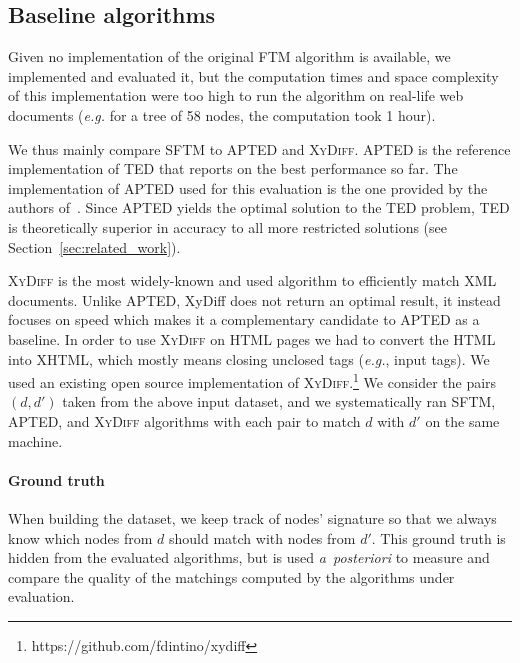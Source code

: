 \subsection{Baseline algorithms}
Given no implementation of the original FTM algorithm is available, we implemented and evaluated it, but the computation times and space complexity of this implementation were too high to run the algorithm on real-life web documents (\emph{e.g.} for a tree of 58 nodes, the computation took 1 hour).

We thus mainly compare SFTM to APTED and \textsc{XyDiff}.
APTED is the reference implementation of TED that reports on the best performance so far.
The implementation of APTED used for this evaluation is the one provided by the authors of~\cite{pawlik2016tree,pawlik2015efficient}.
Since APTED yields the optimal solution to the TED problem, TED is theoretically superior in accuracy to all more restricted solutions (see Section~\ref{sec:related_work}).

\textsc{XyDiff} is the most widely-known and used algorithm to efficiently match XML documents. Unlike APTED, XyDiff does not return an optimal result, it instead focuses on speed which makes it a complementary candidate to APTED as a baseline. 
In order to use \textsc{XyDiff} on HTML pages we had to convert the HTML into XHTML, which mostly means closing unclosed tags (\emph{e.g.}, input tags).
We used an existing open source implementation of \textsc{XyDiff}.\footnote{https://github.com/fdintino/xydiff}
We consider the pairs $(d,d')$ taken from the above input dataset, and we systematically ran SFTM, APTED, and \textsc{XyDiff} algorithms with each pair to match $d$ with $d'$ on the same machine.

\paragraph{Ground truth}
When building the dataset, we keep track of nodes' signature so that we always know which nodes from $d$ should match with nodes from $d'$.
This ground truth is hidden from the evaluated algorithms, but is used \emph{a~posteriori} to measure and compare the quality of the matchings computed by the algorithms under evaluation.

